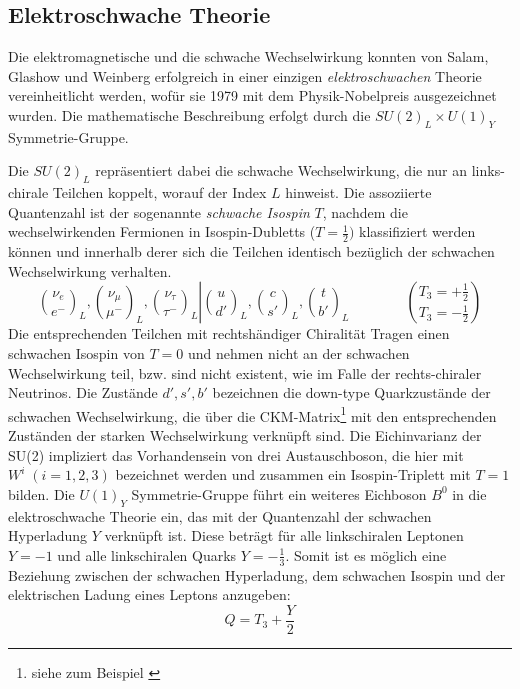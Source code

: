 \subsection{Elektroschwache Theorie}
\label{theory:electroweak}
Die elektromagnetische und die schwache Wechselwirkung konnten von Salam,
Glashow und Weinberg erfolgreich in einer einzigen
\textit{elektroschwachen} Theorie vereinheitlicht werden, wofür sie 1979 mit
dem Physik-Nobelpreis ausgezeichnet wurden. Die mathematische Beschreibung
erfolgt durch die $SU(2)_L \times U(1)_Y$ Symmetrie-Gruppe.

Die $SU(2)_L$ repräsentiert dabei die schwache Wechselwirkung, die nur an
links-chirale Teilchen koppelt, worauf der Index $L$ hinweist. Die assoziierte
Quantenzahl ist der sogenannte \textit{schwache Isospin} $T$, nachdem die
wechselwirkenden Fermionen in Isospin-Dubletts ($T=\frac{1}{2})$ klassifiziert
werden können und innerhalb derer sich die Teilchen identisch bezüglich der
schwachen Wechselwirkung verhalten.
\begin{equation*}
    \left.
    \binom{\nu_e}{e^-}_L , \binom{\nu_\mu}{\mu^-}_L ,
    \binom{\nu_\tau}{\tau^-}_L
    \right|
    \binom{u}{d'}_L , \binom{c}{s'}_L , \binom{t}{b'}_L 
    \qquad\qquad
    \binom{T_3 = +\frac{1}{2}}{T_3 = -\frac{1}{2}}
\end{equation*}
Die entsprechenden Teilchen mit rechtshändiger Chiralität Tragen einen
schwachen Isospin von $T=0$ und nehmen nicht an der schwachen Wechselwirkung
teil, bzw. sind nicht existent, wie im Falle der rechts-chiraler Neutrinos. Die
Zustände $d',s',b'$ bezeichnen die down-type Quarkzustände der schwachen
Wechselwirkung, die über die CKM-Matrix\footnote{siehe zum Beispiel 
\cite{PhysRevD.86.010001}} mit den entsprechenden Zuständen der starken
Wechselwirkung verknüpft sind. Die Eichinvarianz der SU(2) impliziert das
Vorhandensein von drei Austauschboson, die hier mit $W^i\; (i=1,2,3)$
bezeichnet werden und zusammen ein Isospin-Triplett mit $T=1$ bilden. Die
$U(1)_Y$ Symmetrie-Gruppe führt ein weiteres Eichboson $B^0$ in die
elektroschwache Theorie ein, das mit der Quantenzahl der schwachen Hyperladung
$Y$ verknüpft ist. Diese beträgt für alle linkschiralen Leptonen $Y=-1$ und
alle linkschiralen Quarks $Y=-\frac{1}{3}$. Somit ist es möglich eine Beziehung
zwischen der schwachen Hyperladung, dem schwachen Isospin und der elektrischen
Ladung eines Leptons anzugeben:
\begin{equation}
    Q = T_3 + \frac{Y}{2}
    \label{eq:charge_relation}
\end{equation}

